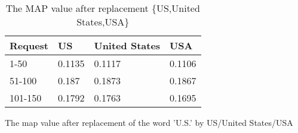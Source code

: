 \documentclass[a4paper]{article}
\begin{document}
\begin{table}[htp]
\centering
\begin{tabular}{|l|l|l|l|}
\hline
Request & US     & United States & USA    \\ \hline
1-50    & 0.1135 & 0.1117        & 0.1106 \\ \hline
51-100  & 0.187  & 0.1873        & 0.1867 \\ \hline
101-150 & 0.1792 & 0.1763        & 0.1695 \\ \hline
\end{tabular}
\caption{The MAP value after replacement \{US,United States,USA\}}
\label{us_vs_usa}
\end{table}

The map value after replacement of the word 'U.S.' by US/United States/USA

\end{document}
